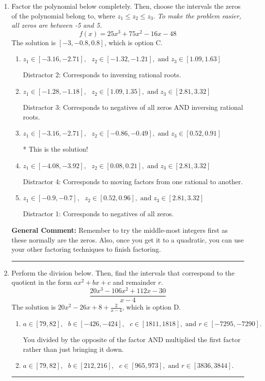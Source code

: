 \documentclass{extbook}[14pt]
\newcommand{\litem}[1]{\item #1

\rule{\textwidth}{0.4pt}}
\begin{document}
\begin{enumerate}\litem{
Factor the polynomial below completely. Then, choose the intervals the zeros of the polynomial belong to, where $z_1 \leq z_2 \leq z_3$. \textit{To make the problem easier, all zeros are between -5 and 5.}
\[ f(x) = 25x^{3} +75 x^{2} -16 x -48 \]The solution is \( [-3, -0.8, 0.8] \), which is option C.\begin{enumerate}[label=\Alph*.]
\item \( z_1 \in [-3.16, -2.71], \text{   }  z_2 \in [-1.32, -1.21], \text{   and   } z_3 \in [1.09, 1.63] \)

 Distractor 2: Corresponds to inversing rational roots.
\item \( z_1 \in [-1.28, -1.18], \text{   }  z_2 \in [1.09, 1.35], \text{   and   } z_3 \in [2.81, 3.32] \)

 Distractor 3: Corresponds to negatives of all zeros AND inversing rational roots.
\item \( z_1 \in [-3.16, -2.71], \text{   }  z_2 \in [-0.86, -0.49], \text{   and   } z_3 \in [0.52, 0.91] \)

* This is the solution!
\item \( z_1 \in [-4.08, -3.92], \text{   }  z_2 \in [0.08, 0.21], \text{   and   } z_3 \in [2.81, 3.32] \)

 Distractor 4: Corresponds to moving factors from one rational to another.
\item \( z_1 \in [-0.9, -0.7], \text{   }  z_2 \in [0.52, 0.96], \text{   and   } z_3 \in [2.81, 3.32] \)

 Distractor 1: Corresponds to negatives of all zeros.
\end{enumerate}

\textbf{General Comment:} Remember to try the middle-most integers first as these normally are the zeros. Also, once you get it to a quadratic, you can use your other factoring techniques to finish factoring.
}
\litem{
Perform the division below. Then, find the intervals that correspond to the quotient in the form $ax^2+bx+c$ and remainder $r$.
\[ \frac{20x^{3} -106 x^{2} +112 x -30}{x -4} \]The solution is \( 20x^{2} -26 x + 8 + \frac{2}{x -4} \), which is option D.\begin{enumerate}[label=\Alph*.]
\item \( a \in [79, 82], \text{   } b \in [-426, -424], \text{   } c \in [1811, 1818], \text{   and   } r \in [-7295, -7290]. \)

 You divided by the opposite of the factor AND multiplied the first factor rather than just bringing it down.
\item \( a \in [79, 82], \text{   } b \in [212, 216], \text{   } c \in [965, 973], \text{   and   } r \in [3836, 3844]. \)


\end{enumerate}}
\end{enumerate}
\end{document}
